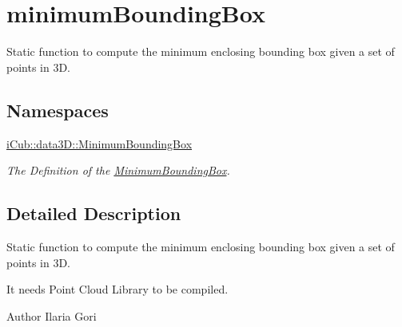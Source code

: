 \section{minimum\+Bounding\+Box}
\label{group__minimumBoundingBox}


Static function to compute the minimum enclosing bounding box given a set of points in 3\+D.  


\subsection*{Namespaces}
\begin{DoxyCompactItemize}
\item 
 \hyperlink{namespaceiCub_1_1data3D_1_1MinimumBoundingBox}{i\+Cub\+::data3\+D\+::\+Minimum\+Bounding\+Box}
\begin{DoxyCompactList}\small\item\em The Definition of the \hyperlink{namespaceiCub_1_1data3D_1_1MinimumBoundingBox}{Minimum\+Bounding\+Box}. \end{DoxyCompactList}\end{DoxyCompactItemize}


\subsection{Detailed Description}
Static function to compute the minimum enclosing bounding box given a set of points in 3\+D. 

It needs Point Cloud Library to be compiled.

\begin{DoxyAuthor}{Author}
Ilaria Gori 
\end{DoxyAuthor}
